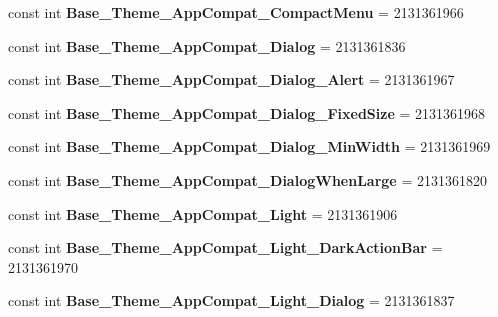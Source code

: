 \begin{DoxyCompactItemize}
const int {\bfseries Base\+\_\+\+Theme\+\_\+\+App\+Compat\+\_\+\+Compact\+Menu} = 2131361966
\item 
\mbox{\label{classXaria_1_1Resource_1_1Style_aaf93f16f85671c8e27c50c5e7c745b48}} 
const int {\bfseries Base\+\_\+\+Theme\+\_\+\+App\+Compat\+\_\+\+Dialog} = 2131361836
\item 
\mbox{\label{classXaria_1_1Resource_1_1Style_ab1ed4956b88748427795fae23d0b945c}} 
const int {\bfseries Base\+\_\+\+Theme\+\_\+\+App\+Compat\+\_\+\+Dialog\+\_\+\+Alert} = 2131361967
\item 
\mbox{\label{classXaria_1_1Resource_1_1Style_a878770b97de7a08dbcc6323e3daf3e86}} 
const int {\bfseries Base\+\_\+\+Theme\+\_\+\+App\+Compat\+\_\+\+Dialog\+\_\+\+Fixed\+Size} = 2131361968
\item 
\mbox{\label{classXaria_1_1Resource_1_1Style_acf3b37e3c22aec7abefb388a5487343f}} 
const int {\bfseries Base\+\_\+\+Theme\+\_\+\+App\+Compat\+\_\+\+Dialog\+\_\+\+Min\+Width} = 2131361969
\item 
\mbox{\label{classXaria_1_1Resource_1_1Style_a34f4789ad9a545aad509612ca5685a89}} 
const int {\bfseries Base\+\_\+\+Theme\+\_\+\+App\+Compat\+\_\+\+Dialog\+When\+Large} = 2131361820
\item 
\mbox{\label{classXaria_1_1Resource_1_1Style_a92ea03984630c3d99f6242cd585ab78e}} 
const int {\bfseries Base\+\_\+\+Theme\+\_\+\+App\+Compat\+\_\+\+Light} = 2131361906
\item 
\mbox{\label{classXaria_1_1Resource_1_1Style_a7bbe2a3e25269fbd6fb0d264f49ab599}} 
const int {\bfseries Base\+\_\+\+Theme\+\_\+\+App\+Compat\+\_\+\+Light\+\_\+\+Dark\+Action\+Bar} = 2131361970
\item 
\mbox{\label{classXaria_1_1Resource_1_1Style_af483420df22a35564a65c8e3110e8204}} 
const int {\bfseries Base\+\_\+\+Theme\+\_\+\+App\+Compat\+\_\+\+Light\+\_\+\+Dialog} = 2131361837
\item 
\mbox{\label{classXaria_1_1Resource_1_1Style_a6aec0a03507494c9642bc5c0d75659b5}} 

\end{DoxyCompactItemize}
